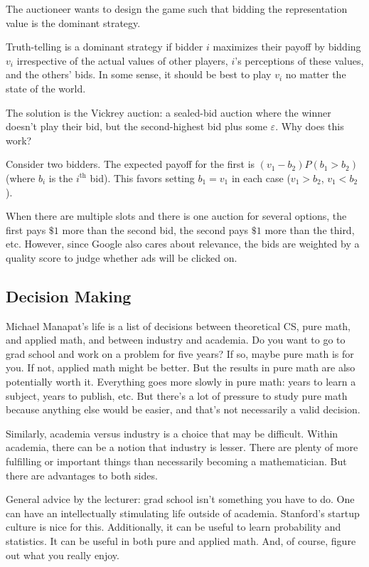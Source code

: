 The auctioneer wants to design the game such that bidding the representation value is the dominant strategy.

Truth-telling is a dominant strategy if bidder $i$ maximizes their payoff by bidding $v_i$ irrespective of the actual values of other players, $i$'s perceptions of these values, and the others' bids. In some sense, it should be best to play $v_i$ no matter the state of the world.

The solution is the Vickrey auction: a sealed-bid auction where the winner doesn't play their bid, but the second-highest bid plus some $\varepsilon$. Why does this work?

Consider two bidders. The expected payoff for the first is $(v_1-b_2)P(b_1>b_2)$ (where $b_i$ is the $i^{\mathrm{th}}$ bid). This favors setting $b_1=v_1$ in each case ($v_1 > b_2$, $v_1 < b_2$).

When there are multiple slots and there is one auction for several options, the first pays $\$1$ more than the second bid, the second pays $\$1$ more than the third, etc. However, since Google also cares about relevance, the bids are weighted by a quality score to judge whether ads will be clicked on.
\subsection{Decision Making}
Michael Manapat's life is a list of decisions between theoretical CS, pure math, and applied math, and between industry and academia. Do you want to go to grad school and work on a problem for five years? If so, maybe pure math is for you. If not, applied math might be better. But the results in pure math are also potentially worth it. Everything goes more slowly in pure math: years to learn a subject, years to publish, etc. But there's a lot of pressure to study pure math because anything else would be easier, and that's not necessarily a valid decision.

Similarly, academia versus industry is a choice that may be difficult. Within academia, there can be a notion that industry is lesser. There are plenty of more fulfilling or important things than necessarily becoming a mathematician. But there are advantages to both sides.

General advice by the lecturer: grad school isn't something you have to do. One can have an intellectually stimulating life outside of academia. Stanford's startup culture is nice for this. Additionally, it can be useful to learn probability and statistics. It can be useful in both pure and applied math. And, of course, figure out what you really enjoy.
